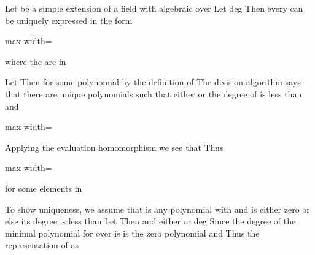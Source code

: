 \documentclass[11pt,oneside]{article}
\begin{document}
\begin{BookBody}

 Let  be a simple extension of a field  with \BookInline{\alpha } algebraic over  Let  deg Then every  can be uniquely expressed in the form

\begin{center}\begin{adjustbox}{max width=\linewidth}\end{adjustbox}\end{center}

\noindent where the  are in 

 Let  Then  for some polynomial  by the definition of  The division algorithm says that there are unique polynomials  such that either  or the degree of  is less than  and

\begin{center}\begin{adjustbox}{max width=\linewidth}\end{adjustbox}\end{center}

\noindent Applying the evaluation homomorphism \BookInline{\phi _{\alpha },\allowbreak } we see that  Thus

\begin{center}\begin{adjustbox}{max width=\linewidth}\end{adjustbox}\end{center}

\noindent for some elements  in 

To show uniqueness, we assume that  is any polynomial with   and  is either zero or else its degree is less than  Let  Then  and either  or deg Since the degree of the minimal polynomial for \BookInline{\alpha } over  is  is the zero polynomial and  Thus the representation of \BookInline{\beta } as


\end{BookBody}
\end{document}
